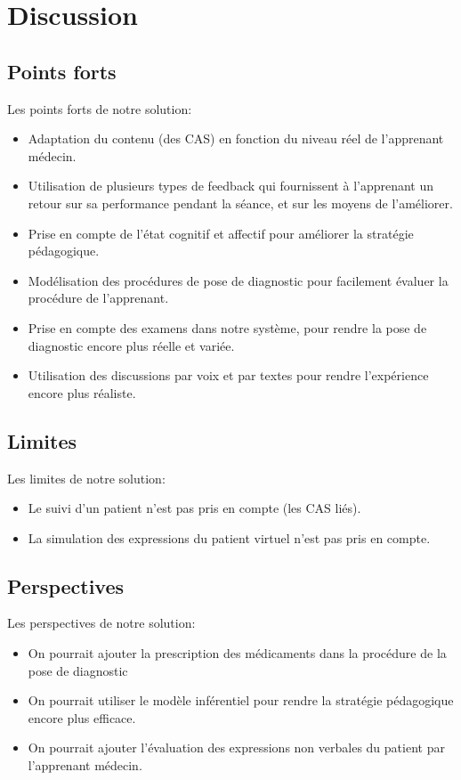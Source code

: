 
\chapter{Discussion}
\label{chp:disc}


\section{Points forts}
Les points forts de notre solution: 

\begin{itemize}
    \item Adaptation du contenu (des CAS) en fonction du niveau réel de l'apprenant médecin.
    \item Utilisation de plusieurs types de feedback qui fournissent à l'apprenant un retour sur sa performance pendant la séance, et sur les moyens de l'améliorer.
    \item Prise en compte de l'état cognitif et affectif pour améliorer la stratégie pédagogique.
    \item Modélisation des procédures de pose de diagnostic pour facilement évaluer la procédure de l'apprenant.
    \item Prise en compte des examens dans notre système, pour rendre la pose de diagnostic encore plus réelle et variée.
    \item Utilisation des discussions par voix et par textes pour rendre l'expérience encore plus réaliste. 
\end{itemize}

\section{Limites}
Les limites de notre solution:

\begin{itemize}
    \item Le suivi d'un patient n'est pas pris en compte (les CAS liés).
    \item La simulation des expressions du patient virtuel n'est pas pris en compte.
\end{itemize}

\section{Perspectives}

Les perspectives de notre solution:

\begin{itemize}
    \item On pourrait ajouter la prescription des médicaments dans la procédure de la pose de diagnostic
    \item On pourrait utiliser le modèle inférentiel pour rendre la stratégie pédagogique encore plus efficace.
    \item On pourrait ajouter l'évaluation des expressions non verbales du patient par l'apprenant médecin.
\end{itemize}